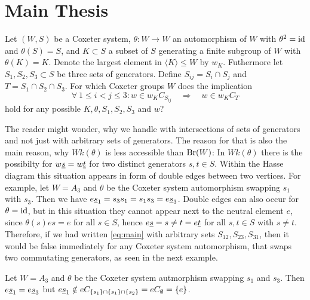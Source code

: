 \section{Main Thesis}
\label{sec:main-thesis}

\begin{ques}
	Let $(W,S)$ be a Coxeter system, $\theta : W \to W$ an automorphism of $W$ with $\theta^2 = \operatorname{id}$ and $\theta(S) = S$, and $K \subset S$ a subset of $S$ generating a finite subgroup of $W$ with $\theta(K) = K$. Denote the largest element in $\langle K \rangle \leq W$ by $w_K$. Futhermore let $S_1,S_2,S_3 \subset S$ be three sets of generators. Define $S_{ij} = S_i \cap S_j$ and $T = S_1 \cap S_2 \cap S_3$. For which Coxeter groups $W$ does the implication
	\begin{equation}
		\label{eq:main}
		\forall \ 1 \leq i < j \leq 3 : w \in w_K C_{S_{ij}} \quad \Rightarrow \quad w \in w_K C_T
	\end{equation}
	hold for any possible $K,\theta,S_1,S_2,S_3$ and $w$?
\end{ques}

The reader might wonder, why we handle with intersections of sets of generators and not just with arbitrary sets of generators. The reason for that is also the main reason, why $Wk(\theta)$ is less accessible than $\operatorname{Br}(W)$: In $Wk(\theta)$ there is the possibilty for $w \underline{s} = w \underline{t}$ for two distinct generators $s,t \in S$. Within the Hasse diagram this situation appears in form of double edges between two vertices. For example, let $W = A_3$ and $\theta$ be the Coxeter system automorphism swapping $s_1$ with $s_3$. Then we have $e \underline{s}_1 = s_3 s_1 = s_1 s_3 = e \underline{s}_3$. Double edges can also occur for $\theta = \operatorname{id}$, but in this situation they cannot appear next to the neutral element $e$, since $\theta(s)es = e$ for all $s \in S$, hence $e \underline{s} = s \neq t = e \underline{t}$ for all $s,t \in S$ with $s \neq t$. Therefore, if we had written \ref{eq:main} with arbitrary sets $S_{12},S_{23},S_{31}$, then it would be false immediately for any Coxeter system automorphism, that swaps two commutating generators, as seen in the next example.

\begin{exam}
	Let $W = A_3$ and $\theta$ be the Coxeter system autmorphism swapping $s_1$ and $s_3$. Then $e \underline{s}_1 = e \underline{s}_3$ but $e \underline{s}_1 \notin eC_{\{s_1\} \cap \{s_1\} \cap \{s_2\}} = eC_\emptyset = \{e\}$.
\end{exam}

